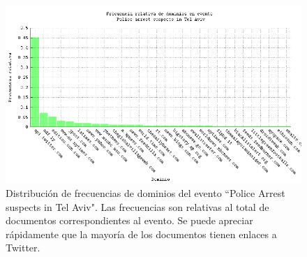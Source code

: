 \begin{figure}[h]
  \centering
  \includegraphics[width=14cm]{./img/telaviv-domain-freqs.png}
  \caption[Dominios evento 1]
   {Distribución de frecuencias de dominios del evento ``Police Arrest
  suspects in Tel Aviv"\label{fig:telaviv-domains}. Las frecuencias son relativas al total de
  documentos correspondientes al evento. Se puede apreciar rápidamente
  que la mayoría de los documentos tienen enlaces a Twitter.}
\end{figure}

